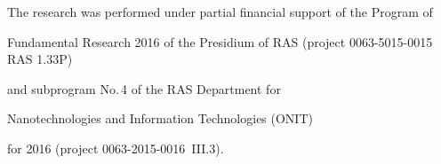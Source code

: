 

















\Ack


\noindent


The research was performed under partial financial support of the Program of 


Fundamental Research 2016 of the Presidium of RAS (project 0063-5015-0015 RAS 1.33P) 


and subprogram No.\,4 of the RAS Department for


Nanotechnologies and Information Technologies (ONIT)


for 2016 (project 0063-2015-0016~III.3).





\renewcommand{\bibname}{\protect\rmfamily References}







